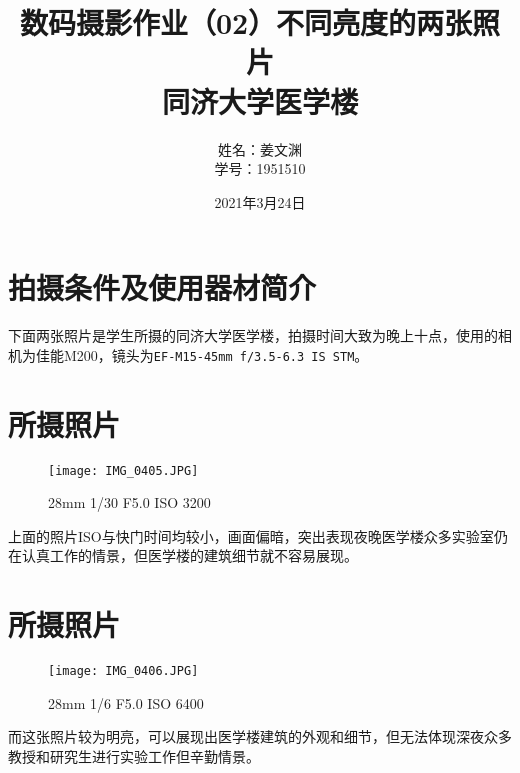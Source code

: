 \documentclass[cn,black,9pt,normal]{elegantnote}
\title{数码摄影作业（02）不同亮度的两张照片\\\small{同济大学医学楼}}
\author{姓名：姜文渊\\学号：1951510}
\date{2021年3月24日}
\begin{document}
\maketitle


\section*{拍摄条件及使用器材简介}

下面两张照片是学生所摄的同济大学医学楼，拍摄时间大致为晚上十点，使用的相机为佳能M200，镜头为\texttt{EF-M15-45mm f/3.5-6.3 IS STM}。

\section{所摄照片}
\begin{figure}[H]
    \centering
    \texttt{[image: IMG\_0405.JPG]}
    \caption{28mm 1/30 F5.0 ISO 3200}
    \label{F-01}
\end{figure}

上面的照片ISO与快门时间均较小，画面偏暗，突出表现夜晚医学楼众多实验室仍在认真工作的情景，但医学楼的建筑细节就不容易展现。
\section{所摄照片}
\begin{figure}[H]
    \centering
    \texttt{[image: IMG\_0406.JPG]}
    \caption{28mm 1/6 F5.0 ISO 6400}
    \label{F-02}
\end{figure}

而这张照片较为明亮，可以展现出医学楼建筑的外观和细节，但无法体现深夜众多教授和研究生进行实验工作但辛勤情景。

\end{document}
